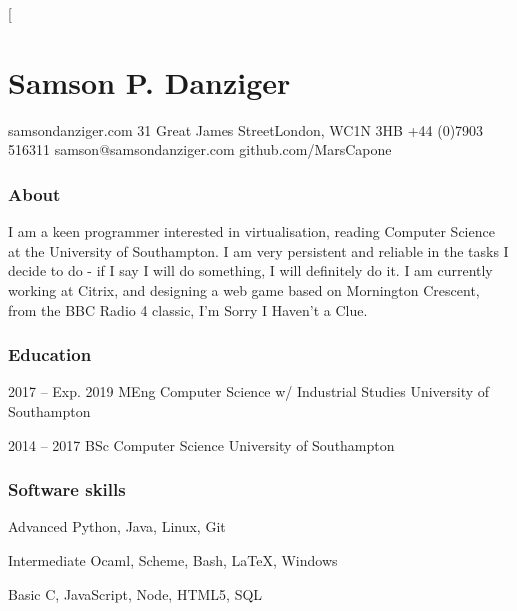 \documentclass{tccv}
\begin{document}
\twocolumn[

\part{Samson P. Danziger}

\begin{multicols}{2}
    \personal
        {samsondanziger.com}
        {31 Great James Street\newline London, WC1N 3HB}
        {+44 (0)7903 516311}
        {samson@samsondanziger.com}
        {github.com/MarsCapone}

    \section{About}
        I am a keen programmer interested in virtualisation, reading Computer Science at the University of Southampton. I am very persistent and reliable in the tasks I decide to do - if I say I will do something, I will definitely do it. I am currently working at Citrix, and designing a web game based on Mornington Crescent, from the BBC Radio 4 classic, I'm Sorry I Haven't a Clue.

\end{multicols}

\hline
\bigskip

\begin{multicols}{2}
    \section{Education}

        \begin{yearlist}

        \item{2017 -- Exp. 2019}
             {MEng Computer Science \newline w/ Industrial Studies}
             {University of Southampton}

        {\item[Awarded 2:1]{2014 -- 2017}
             {BSc Computer Science}
             {University of Southampton}}

        \end{yearlist}

    \section{Software skills}

        \begin{factlist}

        \item{Advanced}
             {Python, Java, Linux, Git}

        \item{Intermediate}
             {Ocaml, Scheme, Bash, \LaTeX, Windows}

        \item{Basic}
             {C, JavaScript, Node, HTML5, SQL}

        \end{factlist}

\end{multicols}
\end{document}

